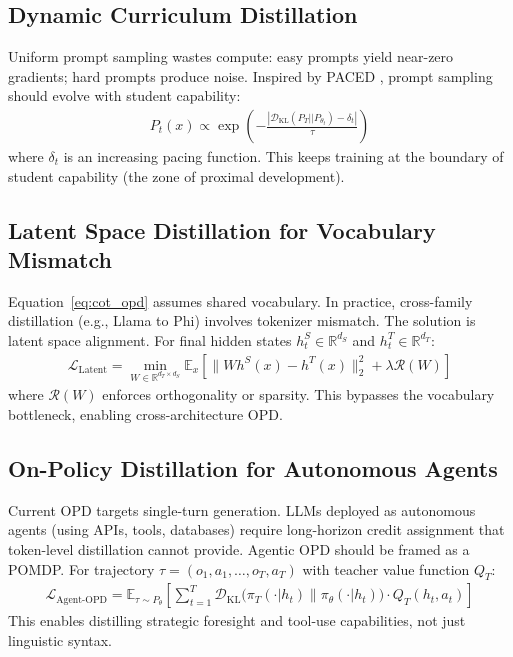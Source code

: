 \documentclass{article} %
\begin{document}
\subsection{Dynamic Curriculum Distillation}
Uniform prompt sampling wastes compute: easy prompts yield near-zero gradients; hard prompts produce noise. Inspired by PACED \citep{2603.11178}, prompt sampling should evolve with student capability:
\begin{align}
P_t(x) \propto \exp\left( -\frac{| \mathcal{D}_{\text{KL}}(P_T || P_{\theta_t}) - \delta_t |}{\tau} \right)
\end{align}
where $\delta_t$ is an increasing pacing function. This keeps training at the boundary of student capability (the zone of proximal development).

\subsection{Latent Space Distillation for Vocabulary Mismatch}
Equation~\ref{eq:cot_opd} assumes shared vocabulary. In practice, cross-family distillation (e.g., Llama to Phi) involves tokenizer mismatch. The solution is latent space alignment. For final hidden states $h_t^S \in \mathbb{R}^{d_S}$ and $h_t^T \in \mathbb{R}^{d_T}$:
\begin{align}
\mathcal{L}_{\text{Latent}} = \min_{W \in \mathbb{R}^{d_T \times d_S}} \mathbb{E}_{x} \left[ \parallel W h^S(x) - h^T(x) \parallel_2^2 + \lambda \mathcal{R}(W) \right]
\end{align}
where $\mathcal{R}(W)$ enforces orthogonality or sparsity. This bypasses the vocabulary bottleneck, enabling cross-architecture OPD.

\subsection{On-Policy Distillation for Autonomous Agents}
Current OPD targets single-turn generation. LLMs deployed as autonomous agents (using APIs, tools, databases) require long-horizon credit assignment that token-level distillation cannot provide. Agentic OPD should be framed as a POMDP. For trajectory $\tau = (o_1, a_1, \dots, o_T, a_T)$ with teacher value function $Q_T$:
\begin{align}
\mathcal{L}_{\text{Agent-OPD}} = \mathbb{E}_{\tau \sim P_\theta} \left[ \sum_{t=1}^T \mathcal{D}_{\text{KL}}\Big( \pi_T(\cdot | h_t) \parallel \pi_\theta(\cdot | h_t) \Big) \cdot Q_T(h_t, a_t) \right]
\end{align}
This enables distilling strategic foresight and tool-use capabilities, not just linguistic syntax.
\end{document}
